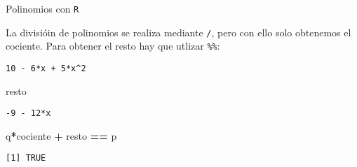 \documentclass[
  ignorenonframetext,
]{beamer}
\newenvironment{Shaded}{\begin{snugshade}}{\end{snugshade}}
\newcommand{\NormalTok}[1]{#1}
\newcommand{\OperatorTok}[1]{\textcolor[rgb]{0.81,0.36,0.00}{\textbf{#1}}}
\newcommand{\StringTok}[1]{\textcolor[rgb]{0.31,0.60,0.02}{#1}}
\begin{document}
\begin{frame}[fragile]{Polinomios con \texttt{R}}
\protect\hypertarget{polinomios-con-r-5}{}

La divisióin de polinomios se realiza mediante \texttt{/}, pero con ello
solo obtenemos el cociente. Para obtener el resto hay que utlizar
\texttt{\%\%}:

\begin{Shaded}
\end{Shaded}

\begin{verbatim}
10 - 6*x + 5*x^2 
\end{verbatim}

\begin{Shaded}
\begin{Highlighting}[]
\NormalTok{resto}
\end{Highlighting}
\end{Shaded}

\begin{verbatim}
-9 - 12*x 
\end{verbatim}

\begin{Shaded}
\begin{Highlighting}[]
\NormalTok{q}\OperatorTok{*}\NormalTok{cociente }\OperatorTok{+}\StringTok{ }\NormalTok{resto }\OperatorTok{==}\StringTok{ }\NormalTok{p}
\end{Highlighting}
\end{Shaded}

\begin{verbatim}
[1] TRUE
\end{verbatim}

\end{frame}
\end{document}
